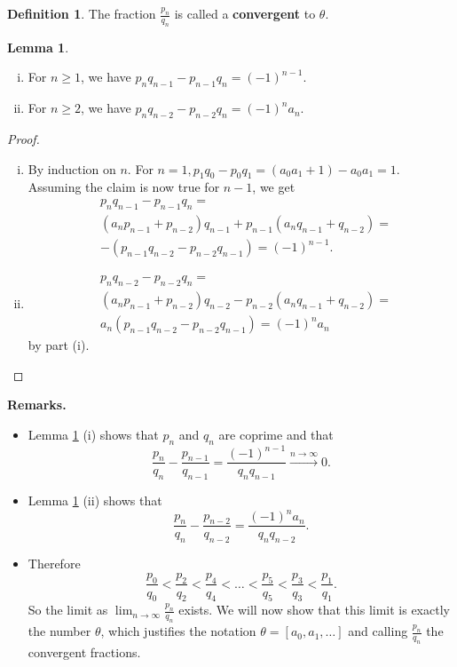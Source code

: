 \documentclass{article}
\theoremstyle{definition}
\newtheorem{lemma}[theorem]{Lemma}
\newtheorem{defn}{Definition}[section]
\begin{document}
\begin{defn}
    The fraction $\frac{p_n}{q_n}$ is called a \textbf{convergent} to $\theta$.
\end{defn}
\begin{lemma}\label{6.3}
    \begin{enumerate}[(i)]
        \item For $n\ge 1$, we have $p_nq_{n-1}-p_{n-1}q_n = (-1)^{n-1}$.
        \item For $n\ge 2$, we have $p_nq_{n-2}-p_{n-2}q_n = (-1)^na_n$.
    \end{enumerate}
\end{lemma}
\begin{proof}
    \begin{enumerate}[(i)]
        \item By induction on $n$. For $n=1, p_1q_0-p_0q_1=(a_0a_1+1)-a_0a_1=1$.
        Assuming the claim is now true for $n-1$, we get 
        \begin{align*}
            &p_nq_{n-1}-p_{n-1}q_n =\\& (a_np_{n-1}+p_{n-2})q_{n-1}+p_{n-1}(a_nq_{n-1}+q_{n-2}) = \\
            &-(p_{n-1}q_{n-2}-p_{n-2}q_{n-1})=(-1)^{n-1}.
        \end{align*}
        \item
        \begin{align*}
            &p_nq_{n-2}-p_{n-2}q_n =\\& (a_np_{n-1}+p_{n-2})q_{n-2}-p_{n-2}(a_nq_{n-1}+q_{n-2}) =\\
            & a_n(p_{n-1}q_{n-2}-p_{n-2}q_{n-1}) =(-1)^na_n
        \end{align*}
        by part (i).
    \end{enumerate}
\end{proof}
\textbf{Remarks.}
\begin{itemize}
    \item Lemma \ref{6.3} (i) shows that $p_n$ and $q_n$ are coprime and that $$\frac{p_n}{q_n}-\frac{p_{n-1}}{q_{n-1}} = \frac{(-1)^{n-1}}{q_nq_{n-1}} \stackrel{n \to \infty}{\to} 0.$$
    \item Lemma \ref{6.3} (ii) shows that \[
    \frac{p_n}{q_n} - \frac{p_{n-2}}{q_{n-2}} = \frac{(-1)^na_n}{q_nq_{n-2}}.
    \]
    \item Therefore \[
    \frac{p_0}{q_0}<\frac{p_2}{q_2}<\frac{p_4}{q_4}<\ldots < \frac{p_5}{q_5}<\frac{p_3}{q_3}<\frac{p_1}{q_1}.
    \]
    So the limit as $\lim_{n \to \infty}\frac{p_n}{q_n}$ exists. We will now show that this limit is exactly the number $\theta$, which justifies the notation $\theta = [a_0,a_1,\ldots]$ and calling $\frac{p_n}{q_n}$ the convergent fractions.
\end{itemize} 
\end{document}
